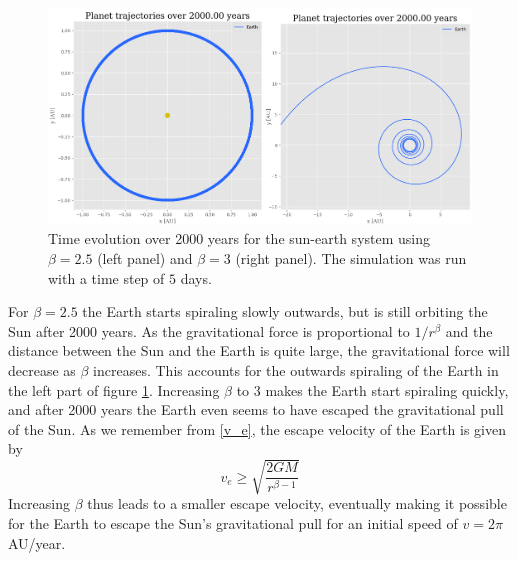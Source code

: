 \documentclass[12pt]{article}
\numberwithin{figure}{section}
\numberwithin{table}{section}
\begin{document}
\begin{figure}[ht]
 \centerline{\includegraphics[scale = 0.45]{earth_sun_beta_combined.png}}
 \caption{Time evolution over 2000 years for the sun-earth system using $\beta=2.5$ (left panel) and $\beta=3$ (right panel). The simulation was run with a time step of $5$ days.}
 \label{fig:beta_gravity}
\end{figure}

\noindent For $\beta=2.5$ the Earth starts spiraling slowly outwards, but is still orbiting the Sun after 2000 years. As the gravitational force is proportional to $1/r^\beta$ and the distance between the Sun and the Earth is quite large, the gravitational force will decrease as $\beta$ increases. This accounts for the outwards spiraling of the Earth in the left part of figure \ref{fig:beta_gravity}. Increasing $\beta$ to $3$ makes the Earth start spiraling quickly, and after 2000 years the Earth even seems to have escaped the gravitational pull of the Sun. As we remember from \eqref{v_e}, the escape velocity of the Earth is given by
\begin{equation}
   \label{v_e_beta}
   v_e \geq \sqrt{\frac{2GM}{r^{\beta-1}}}
\end{equation}
Increasing $\beta$ thus leads to a smaller escape velocity, eventually making it possible for the Earth to escape the Sun's gravitational pull for an initial speed of $v=2\pi$ AU/year.




\end{document}
